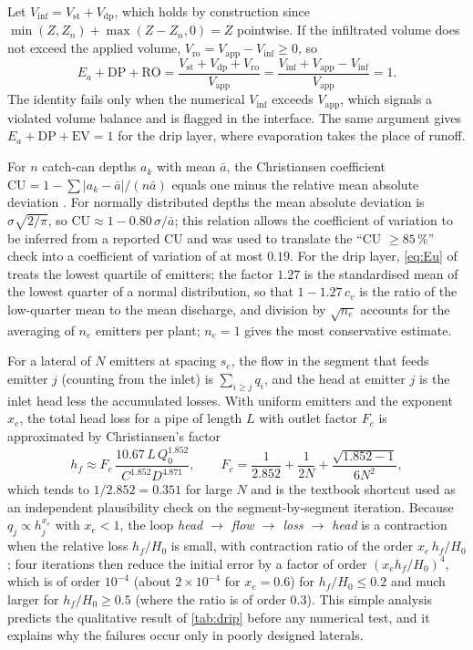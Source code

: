 Let $V_{\mathrm{inf}}=V_{\mathrm{st}}+V_{\mathrm{dp}}$, which holds by construction since $\min(Z,Z_n)+\max(Z-Z_n,0)=Z$ pointwise. If the infiltrated volume does not exceed the applied volume, $V_{\mathrm{ro}}=V_{\mathrm{app}}-V_{\mathrm{inf}}\ge0$, so
\begin{equation}
E_a+\mathrm{DP}+\mathrm{RO}=\frac{V_{\mathrm{st}}+V_{\mathrm{dp}}+V_{\mathrm{ro}}}{V_{\mathrm{app}}}=\frac{V_{\mathrm{inf}}+V_{\mathrm{app}}-V_{\mathrm{inf}}}{V_{\mathrm{app}}}=1.
\label{eq:effclose}
\end{equation}
The identity fails only when the numerical $V_{\mathrm{inf}}$ exceeds $V_{\mathrm{app}}$, which signals a violated volume balance and is flagged in the interface. The same argument gives $E_a+\mathrm{DP}+\mathrm{EV}=1$ for the drip layer, where evaporation takes the place of runoff.

For $n$ catch-can depths $a_k$ with mean $\bar a$, the Christiansen coefficient $\mathrm{CU}=1-\sum|a_k-\bar a|/(n\bar a)$ equals one minus the relative mean absolute deviation \citep{Christiansen1942}. For normally distributed depths the mean absolute deviation is $\sigma\sqrt{2/\pi}$, so $\mathrm{CU}\approx1-0.80\,\sigma/\bar a$; this relation allows the coefficient of variation to be inferred from a reported CU and was used to translate the ``CU $\ge85$\,\%'' check into a coefficient of variation of at most $0.19$. For the drip layer, \cref{eq:Eu} of \citet{KellerKarmeli1974} treats the lowest quartile of emitters; the factor $1.27$ is the standardised mean of the lowest quarter of a normal distribution, so that $1-1.27\,c_v$ is the ratio of the low-quarter mean to the mean discharge, and division by $\sqrt{n_e}$ accounts for the averaging of $n_e$ emitters per plant; $n_e=1$ gives the most conservative estimate.

For a lateral of $N$ emitters at spacing $s_e$, the flow in the segment that feeds emitter $j$ (counting from the inlet) is $\sum_{i\ge j}q_i$, and the head at emitter $j$ is the inlet head less the accumulated losses. With uniform emitters and the exponent $x_e$, the total head loss for a pipe of length $L$ with outlet factor $F_c$ is approximated by Christiansen's factor
\begin{equation}
h_f\approx F_c\,\frac{10.67\,L\,Q_0^{1.852}}{C^{1.852}D^{4.871}},\qquad F_c=\frac1{2.852}+\frac1{2N}+\frac{\sqrt{1.852-1}}{6N^2},
\label{eq:Fc}
\end{equation}
which tends to $1/2.852=0.351$ for large $N$ and is the textbook shortcut used as an independent plausibility check on the segment-by-segment iteration. Because $q_j\propto h_j^{x_e}$ with $x_e<1$, the loop \emph{head $\to$ flow $\to$ loss $\to$ head} is a contraction when the relative loss $h_f/H_0$ is small, with contraction ratio of the order $x_e\,h_f/H_0$; four iterations then reduce the initial error by a factor of order $(x_eh_f/H_0)^4$, which is of order $10^{-4}$ (about $2\times10^{-4}$ for $x_e=0.6$) for $h_f/H_0\le0.2$ and much larger for $h_f/H_0\ge0.5$ (where the ratio is of order $0.3$). This simple analysis predicts the qualitative result of \cref{tab:drip} before any numerical test, and it explains why the failures occur only in poorly designed laterals.

